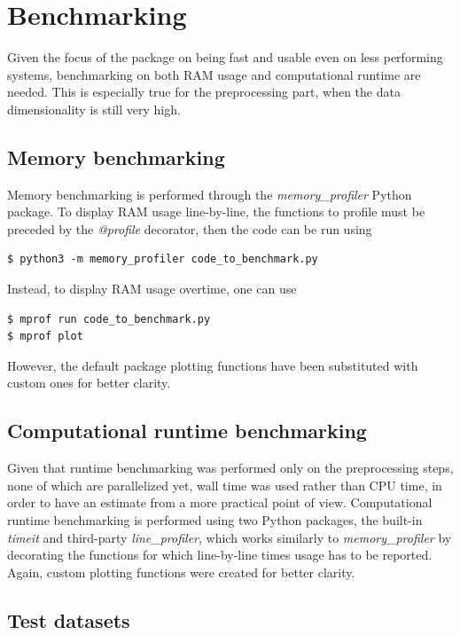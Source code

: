 \section{Benchmarking}

Given the focus of the package on being fast and usable even on less performing systems, benchmarking on both RAM usage and computational runtime are needed. This is especially true for the preprocessing part, when the data dimensionality is still very high.

\subsection{Memory benchmarking}

Memory benchmarking is performed through the \emph{memory\_profiler}\cite{memprof} Python package.
To display RAM usage line-by-line, the functions to profile must be preceded by the \emph{@profile} decorator, then the code can be run using 
\begin{lstlisting}[style=bash]
$ python3 -m memory_profiler code_to_benchmark.py
\end{lstlisting}
Instead, to display RAM usage overtime, one can use
\begin{lstlisting}[style=bash]
$ mprof run code_to_benchmark.py
$ mprof plot
\end{lstlisting}
However, the default package plotting functions have been substituted with custom ones for better clarity.

\subsection{Computational runtime benchmarking}

Given that runtime benchmarking was performed only on the preprocessing steps, none of which are parallelized yet, wall time was used rather than CPU time, in order to have an estimate from a more practical point of view. Computational runtime benchmarking is performed using two Python packages, the built-in \emph{timeit} and third-party \emph{line\_profiler}\cite{lineprof}, which works similarly to \emph{memory\_profiler} by decorating the functions for which line-by-line times usage has to be reported. Again, custom plotting functions were created for better clarity.

\subsection{Test datasets}

